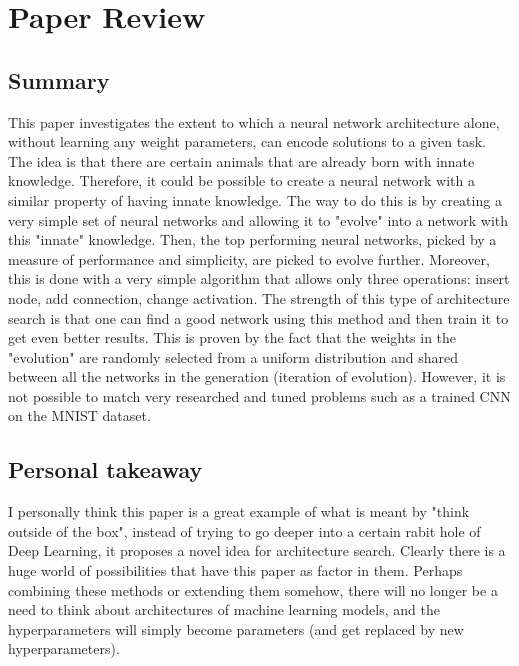 \documentclass[twoside]{article}
\begin{document}
\newpage
\section{Paper Review}
\subsection{Summary}
This paper investigates the extent to which a neural network architecture alone, without learning any weight parameters, can encode 
solutions to a given task. The idea is that there are certain animals that are already born with innate knowledge. Therefore, 
it could be possible to create a neural network with a similar property of having innate knowledge. The way to do this is by creating
a very simple set of neural networks and allowing it to "evolve" into a network with this "innate" knowledge. Then, the top performing
neural networks, picked by a measure of performance and simplicity, are picked to evolve further. Moreover, this is done
with a very simple algorithm that allows only three operations: insert node, add connection, change activation. The strength of this
type of architecture search is that one can find a good network using this method and then train it to get even better results. This is
proven by the fact that the weights in the "evolution" are randomly selected from a uniform distribution and shared between all the 
networks in the generation (iteration of evolution).
However, it is not possible to match very researched and tuned problems such as a trained CNN on the MNIST dataset.

\subsection{Personal takeaway}
I personally think this paper is a great example of what is meant by "think outside of the box", instead of trying to go deeper into
a certain rabit hole of Deep Learning, it proposes a novel idea for architecture search. Clearly there is a huge world of possibilities
that have this paper as factor in them. Perhaps combining these methods or extending them somehow, there will no longer be a need to 
think about architectures of machine learning models, and the hyperparameters will simply become parameters (and get replaced by new 
hyperparameters).
\end{document}
